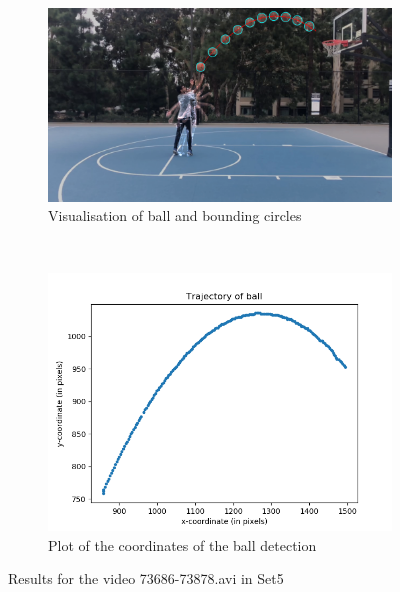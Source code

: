 \documentclass[12pt]{article}
\begin{document}
\begin{figure}[H]
    \centering
    \begin{subfigure}[b]{0.7\textwidth}
         \centering
         \includegraphics[width=\textwidth]{../results/visualisations/output_Set5_73686-73878.png}
         \caption{Visualisation of ball and bounding circles}
     \end{subfigure}\\
     \begin{subfigure}[b]{0.7\textwidth}
         \centering
         \includegraphics[width=\textwidth]{../results/plots/Set5_73686-73878.png}
         \caption{Plot of the coordinates of the ball detection}
     \end{subfigure}
     \caption{Results for the video 73686-73878.avi in Set5}
\end{figure}
\end{document}
